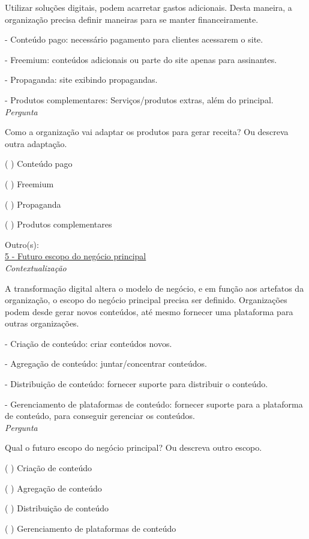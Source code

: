 Utilizar soluções digitais, podem acarretar gastos adicionais. Desta maneira, a organização precisa definir maneiras para se manter financeiramente.


- Conteúdo pago: necessário pagamento para clientes acessarem o site.

- Freemium: conteúdos adicionais ou parte do site apenas para assinantes.

- Propaganda: site exibindo propagandas.

- Produtos complementares: Serviços/produtos extras, além do principal.\\


\textit{Pergunta}

Como a organização vai adaptar os produtos para gerar receita? Ou descreva outra adaptação.

( ) Conteúdo pago

( ) Freemium

( ) Propaganda

( ) Produtos complementares

Outro(s):\\

\underline{5 - Futuro escopo do negócio principal}\\

\textit{Contextualização}

A transformação digital altera o modelo de negócio, e em função aos artefatos da organização, o escopo do negócio principal precisa ser definido. Organizações podem desde gerar novos conteúdos, até mesmo fornecer uma plataforma para outras organizações.

- Criação de conteúdo: criar conteúdos novos.

- Agregação de conteúdo: juntar/concentrar conteúdos.

- Distribuição de conteúdo: fornecer suporte para distribuir o conteúdo.

- Gerenciamento de plataformas de conteúdo: fornecer suporte para a plataforma de conteúdo, para conseguir gerenciar os conteúdos.\\


\textit{Pergunta}

Qual o futuro escopo do negócio principal? Ou descreva outro escopo.

( ) Criação de conteúdo

( ) Agregação de conteúdo

( ) Distribuição de conteúdo

( ) Gerenciamento de plataformas de conteúdo

